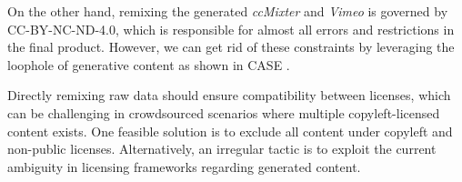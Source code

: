 On the other hand, remixing the generated \textit{ccMixter} and \textit{Vimeo} is governed by CC-BY-NC-ND-4.0, which is responsible for almost all errors and restrictions in the final product.
However, we can get rid of these constraints by leveraging the loophole of generative content as shown in CASE .


Directly remixing raw data should ensure compatibility between licenses, which can be challenging in crowdsourced scenarios where multiple copyleft-licensed content exists.
One feasible solution is to exclude all content under copyleft and non-public licenses. 
Alternatively, an irregular tactic is to exploit the current ambiguity in licensing frameworks regarding generated content.

